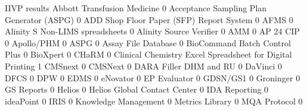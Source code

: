 \documentclass{article}
\begin{document}
\begin{Schunk}
\begin{Soutput}
                                                            IIVP results
  Abbott Transfusion Medicine                                          0
  Acceptance Sampling Plan Generator (ASPG)                            0
  ADD Shop Floor Paper (SFP) Report System                             0
  AFMS                                                                 0
  Alinity S Non-LIMS spreadsheets                                      0
  Alinity Source Verifier                                              0
  AMM                                                                  0
  AP 24 CIP                                                            0
  Apollo/PHM                                                           0
  ASPG                                                                 0
  Assay File Database                                                  0
  BioCommand Batch Control Plus                                        0
  BioXpert                                                             0
  CHaRM                                                                0
  Clinical Chemistry Excel Spreadsheet for Digital Printing            1
  CMSnext                                                              0
  CMSNext                                                              0
  DARA Filler DHM and RU                                               0
  DaVinci                                                              0
  DFCS                                                                 0
  DPW                                                                  0
  EDMS                                                                 0
  eNovator                                                             0
  EP Evaluator                                                         0
  GDSN/GS1                                                             0
  Groninger                                                            0
  GS Reports                                                           0
  Helios                                                               0
  Helios Global Contact Center                                         0
  IDA Reporting                                                        0
  ideaPoint                                                            0
  IRIS                                                                 0
  Knowledge Management                                                 0
  Metrics Library                                                      0
  MQA Protocol                                                         0

\end{Soutput}
\end{Schunk}
\end{document}
